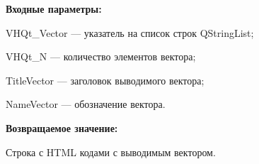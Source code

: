 \textbf{Входные параметры:}
 
VHQt\_Vector --- указатель на список строк QStringList;
 
    VHQt\_N --- количество элементов вектора;
 
    TitleVector --- заголовок выводимого вектора;
 
    NameVector --- обозначение вектора.

\textbf{Возвращаемое значение:}

Строка с HTML кодами с выводимым вектором.